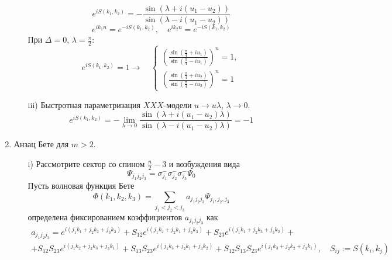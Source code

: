 \documentclass[12pt]{article}
\theoremstyle{definition}
\begin{document}
\begin{enumerate}
\begin{itemize}
        \begin{equation}
            \boxed{e^{iS(k_1,k_2)}=-\frac{\sin(\lambda+i(u_1-u_2))}{\sin(\lambda-i(u_1-u_2))}}
        \end{equation}
        \begin{equation}
            e^{ik_1n}=e^{-iS(k_1,k_2)},\quad e^{ik_2n}=e^{-iS(k_1,k_2)}
        \end{equation}
        При $\Delta=0$, $\lambda=\frac{\pi}{2}$:
        \begin{equation}
             e^{iS(k_1,k_2)}=1\rightarrow\quad \boxed{\begin{cases}
                 \left(\frac{\sin(\frac{\pi}{4}+iu_1)}{\sin(\frac{\pi}{4}-iu_1)}\right)^n=1,\\
                 \left(\frac{\sin(\frac{\pi}{4}+iu_2)}{\sin(\frac{\pi}{4}-iu_2)}\right)^n=1
             \end{cases}}
        \end{equation}
        \item[iii)] Быстротная параметризация $XXX$-модели $u\rightarrow u\lambda$, $\lambda\rightarrow0$.
        \begin{equation}
            e^{iS(k_1,k_2)}=-\lim\limits_{\lambda\rightarrow0}\frac{\sin(\lambda+i(u_1-u_2)\lambda)}{\sin(\lambda-i(u_1-u_2)\lambda)}=-1
        \end{equation}
    \end{itemize}
    \item Анзац Бете для $m>2$.
        \begin{itemize}
            \item[i)] Рассмотрите сектор со спином $\frac{n}{2}-3$ и возбуждения вида
            \begin{equation}
                \Psi_{j_1j_2j_3}=\sigma^-_{j_1}\sigma^-_{j_2}\sigma^-_{j_3}\Psi_0
            \end{equation}
            Пусть волновая функция Бете
            \begin{equation}
                \Phi(k_1,k_2,k_3)=\sum\limits_{j_1<j_2<j_3}a_{j_1j_2j_3}\Psi_{j_1,j_2,j_3}
            \end{equation}
            определена фиксированием коэффициентов $a_{j_1j_2j_3}$ как
            \begin{multline}
                a_{j_1j_2j_3}=e^{i(j_1k_1+j_2k_2+j_3k_3)}+S_{12}e^{i(j_1k_2+j_2k_1+j_3k_3)}+S_{23}e^{i(j_1k_1+j_2k_3+j_3k_2)}+\\+S_{12}S_{23}e^{i(j_1k_2+j_2k_3+j_3k_1)}+S_{13}S_{23}e^{i(j_1k_3+j_2k_1+j_3k_2)}+S_{12}S_{13}S_{23}e^{i(j_1k_3+j_2k_2+j_3k_1)},\quad S_{ij}:=S(k_i,k_j)

\end{multline}
\end{itemize}
\end{enumerate}
\end{document}
